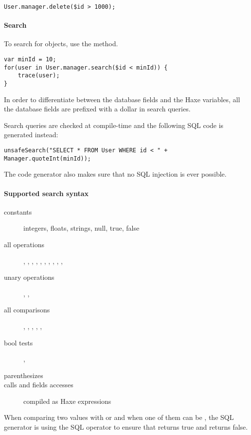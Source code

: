 \begin{lstlisting} 
User.manager.delete($id > 1000);
\end{lstlisting} 


\paragraph{Search}

To search for objects, use the  method.

\begin{lstlisting} 
var minId = 10;
for(user in User.manager.search($id < minId)) {
    trace(user);
}
\end{lstlisting} 

In order to differentiate between the database fields and the Haxe variables, all the database fields are prefixed with a dollar in search queries.

Search queries are checked at compile-time and the following SQL code is generated instead:

\begin{lstlisting} 
unsafeSearch("SELECT * FROM User WHERE id < " + Manager.quoteInt(minId));
\end{lstlisting} 

The code generator also makes sure that no SQL injection is ever possible.

\paragraph{Supported search syntax}

\begin{description}
	\item[constants] integers, floats, strings, null, true, false
	\item[all operations] \expr{+}, \expr{-}, \expr{*}, \expr{/}, \expr{\%}, \expr{|}, \expr{&}, \expr{^}, \expr{>>}, \expr{<<}, \expr{>>>}
	\item[unary operations] \expr{!}, \expr{-}, \expr{~}
	\item[all comparisons] \expr{==} , \expr{>=} , \expr{<=}, \expr{>}, \expr{<}, \expr{!=}
	\item[bool tests] \expr{&&}, \expr{||}
	\item[parenthesizes] \expr{()}
	\item[calls and fields accesses] compiled as Haxe expressions
\end{description} 

When comparing two values with \expr{==} or \expr{!=} and when one of them can be , the SQL generator is using the \expr{<=>} SQL operator to ensure that  returns true and  returns false.

